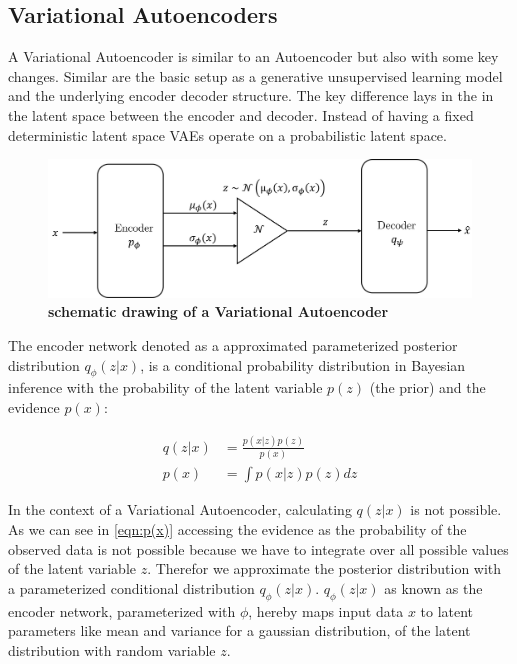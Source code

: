 \subsection{Variational Autoencoders}\label{sec:VAE}


A Variational Autoencoder is similar to an Autoencoder but also with some key changes. Similar are the basic setup as a generative unsupervised learning model and the underlying encoder decoder structure. The key difference lays in the in the latent space between the encoder and decoder. Instead of having a fixed deterministic latent space VAEs operate on a probabilistic latent space.
\begin{figure}
    \centering
    \includegraphics[width=0.7\linewidth]{figures/background/VAE.png}
    \caption[Variational Autoencoder schematics]{\textbf{schematic drawing of a Variational Autoencoder}}
    \label{fig:Variational_Autoencoder_schematics}
\end{figure}

The encoder network denoted as a approximated parameterized posterior distribution $q_\phi(z|x)$, is a conditional probability distribution in Bayesian inference with the probability of the latent variable $p(z)$ (the prior) and the evidence $p(x)$: 

\begin{align}
	q(z|x) &= \frac{p(x|z) p(z)}{p(x)} \label{eqn:Bayesian-inference}\\
	p(x) &= \int p(x|z)p(z) dz \label{eqn:p(x)}
\end{align}

In the context of a Variational Autoencoder, calculating $q(z|x)$ is not possible. As we can see in \eqref{eqn:p(x)} accessing the evidence as the probability of the observed data is not possible because we have to integrate over all possible values of the latent variable $z$. Therefor we approximate the posterior distribution with a parameterized conditional distribution $q_\phi(z|x)$. $q_\phi(z|x)$ as known as the encoder network, parameterized with $\phi$, hereby maps input data $x$ to latent parameters like mean and variance for a gaussian distribution, of the latent distribution with random variable $z$. 

